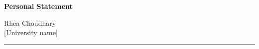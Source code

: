 \documentclass[11pt]{article}
\newcommand{\school}{[University name]}
\begin{document}
\noindent
\begin{minipage}[t]{0.60\textwidth}
  {\large\bfseries Personal Statement}
\end{minipage}\hfill
\begin{minipage}[t]{0.38\textwidth}
  \raggedleft
  Rhea Choudhary\\[2pt]
  \school
\end{minipage}

\vspace{0.5em}
\noindent\rule{\textwidth}{0.8pt}

\vspace{1.1em}





\end{document}
